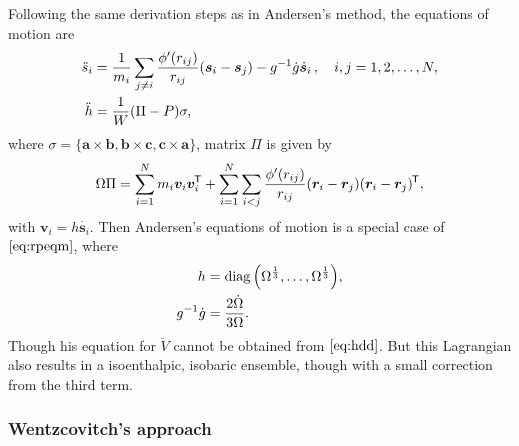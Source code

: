 Following the same derivation steps as in Andersen's method, the equations of motion are
\begin{subequations}
	\label{eq:rpeqm}
	\begin{align}
		\ddot{s}_i & = \frac{ 1 }{ m_i } \sum_{j\neq i}
		\frac{ \phi'(r_{ij}) }{ r_{ij} } (\bm{s}_i - \bm{s}_j) - g^{-1}\dot{g}
		\dot{ \bm{s} }_i \thinspace, \quad i, j = 1, 2, \ldots, N,\label{eq:rpsdd} \\
		\ddot{h}   & = \frac{ 1 }{ W } (\Pi - P) \sigma, \label{eq:hdd}
	\end{align}
\end{subequations}
where $\sigma = \{\bm{a}\times \bm{b},
	\bm{b}\times \bm{c}, \bm{c}\times \bm{a}\}$,
matrix $\Pi$ is given by
\begin{equation}\label{eq:pim&frr}
	\Omega \Pi = \sum_{i=1}^{N} m_i \bm{v}_i \bm{v}_i^{\mkern-1.5mu\mathsf{T}}
	+ \sum_{i=1}^{N} \sum_{i<j} \frac{ \phi'(r_{ij}) }{ r_{ij} }
	(\bm{r}_i - \bm{r}_j) (\bm{r}_i - \bm{r}_j)^{\mkern-1.5mu\mathsf{T}},
\end{equation}
with $\bm{v}_i = h \dot{ \bm{s}_i }$.
Then Andersen's equations of motion is a special case of
$\eqref{eq:rpeqm}$,
where
\begin{subequations}
	\begin{align}
		h              & = \operatorname{diag} \Big(  \Omega^{\frac{ 1 }{ 3 }}, \ldots,
		\Omega^{\frac{ 1 }{ 3 }}  \Big), \\
		g^{-1} \dot{g} & =
		\frac{ 2 \dot{\Omega} }{3 \Omega }.
	\end{align}
\end{subequations}
Though his equation for
$\ddot{V}$ cannot be obtained from $\eqref{eq:hdd}$. But
this Lagrangian also results in a isoenthalpic, isobaric ensemble,
though with a small correction from the third term.


\subsubsection{Wentzcovitch's approach}

